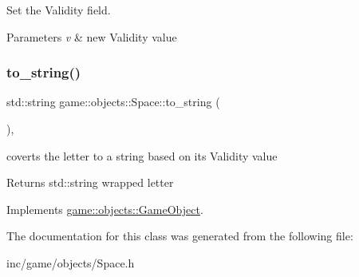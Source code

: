 Set the Validity field. 


\begin{DoxyParams}{Parameters}
{\em v} & new Validity value \\
\hline
\end{DoxyParams}
\mbox{\label{classgame_1_1objects_1_1Space_a1498390be3206f8c9e4e8f77bb939c31}} 
\subsubsection{\texorpdfstring{to\+\_\+string()}{to\_string()}}
{\footnotesize\ttfamily std\+::string game\+::objects\+::\+Space\+::to\+\_\+string (\begin{DoxyParamCaption}{ }\end{DoxyParamCaption})\hspace{0.3cm}{\ttfamily [override]}, {\ttfamily [virtual]}}



coverts the letter to a string based on its Validity value 

\begin{DoxyReturn}{Returns}
std\+::string wrapped letter 
\end{DoxyReturn}


Implements \hyperlink{classgame_1_1objects_1_1GameObject_a59faf4c33c2c0d8a9d52a26029d1488f}{game\+::objects\+::\+Game\+Object}.



The documentation for this class was generated from the following file\+:\begin{DoxyCompactItemize}
\item 
inc/game/objects/Space.\+h\end{DoxyCompactItemize}
